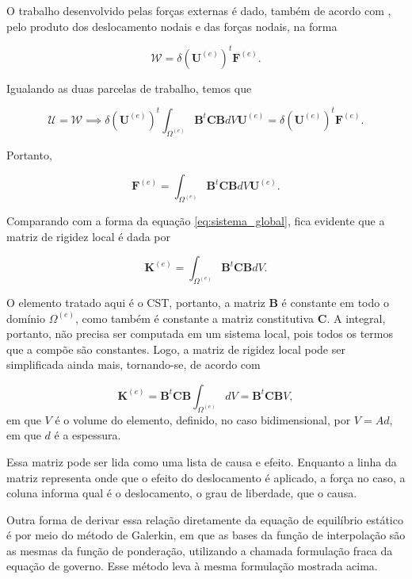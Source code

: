 O trabalho desenvolvido pelas forças externas é dado, também de acordo com , pelo produto dos deslocamento nodais e das forças nodais, na forma

\begin{equation}
    \mathcal{W} = \delta (\bm{U}^{(e)})^t \bm{F}^{(e)}.
\end{equation}

Igualando as duas parcelas de trabalho, temos que

\begin{equation}
    \mathcal{U} =  \mathcal{W}\implies
    \delta (\bm{U}^{(e)})^t \int_{\Omega^{(e)}} \bm{B}^t \bm{C} \bm{B} dV \bm{U}^{(e)} = \delta (\bm{U}^{(e)})^t \bm{F}^{(e)}.
\end{equation}

Portanto, 

\begin{equation}
    \bm{F}^{(e)} = \int_{\Omega^{(e)}} \bm{B}^t \bm{C} \bm{B} dV \bm{U}^{(e)}.
    \label{eq:forca_equivalente}
\end{equation}

Comparando com a forma da equação \ref{eq:sistema_global}, fica evidente que a matriz de rigidez local é dada por

\begin{equation}
    \bm{K}^{(e)} = \int_{\Omega^{(e)}} \bm{B}^t \bm{C} \bm{B} dV.
\end{equation}

O elemento tratado aqui é o CST, portanto, a matriz $\bm{B}$ é constante em todo o domínio $\Omega^{(e)}$, como também é constante a matriz constitutiva $\bm{C}$. A integral, portanto, não precisa ser computada em um sistema local, pois todos os termos que a compõe são constantes. Logo, a matriz de rigidez local pode ser simplificada ainda mais, tornando-se, de acordo com 

\begin{equation}
    \bm{K}^{(e)} = \bm{B}^t \bm{C} \bm{B} \int_{\Omega^{(e)}} dV = \bm{B}^t \bm{C} \bm{B} V,
\end{equation}
em que $V$ é o volume do elemento, definido, no caso bidimensional, por $V = A d$, em que $d$ é a espessura.

Essa matriz pode ser lida como uma lista de causa e efeito. Enquanto a linha da matriz representa onde que o efeito do deslocamento é aplicado, a força no caso, a coluna informa qual é o deslocamento, o grau de liberdade, que o causa. \cite{LOGAN}

Outra forma de derivar essa relação diretamente da equação de equilíbrio estático é por meio do método de Galerkin, em que as bases da função de interpolação são as mesmas da função de ponderação, utilizando a chamada formulação fraca da equação de governo. Esse método leva à mesma formulação mostrada acima.

